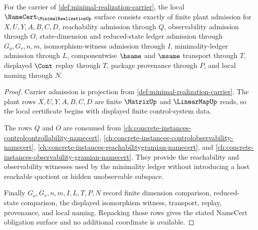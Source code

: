 \begin{theorem}
\label{thm:minimal-realization-namecert-obligations}
For the carrier of \autoref{def:minimal-realization-carrier}, the local $\NameCert_{\MinimalRealizationUp}$ surface consists exactly of finite plant admission for $X,U,Y,A,B,C,D$, reachability admission through $Q$, observability admission through $O$, state-dimension and reduced-state ledger admission through $G_o,G_r,n,m$, isomorphism-witness admission through $I$, minimality-ledger admission through $L$, componentwise $\hsame$ and $\msame$ transport through $T$, displayed $\Cont$ replay through $T$, package provenance through $P$, and local naming through $N$.
\end{theorem}
\begin{proof}
Carrier admission is projection from \autoref{def:minimal-realization-carrier}. The plant rows $X,U,Y,A,B,C,D$ are finite $\MatrixUp$ and $\LinearMapUp$ reads, so the local certificate begins with displayed finite control-system data.

The rows $Q$ and $O$ are consumed from \autoref{ch:concrete-instances-controlcontrollability-namecert}, \autoref{ch:concrete-instances-controlobservability-namecert}, \autoref{ch:concrete-instances-reachabilitygramian-namecert}, and \autoref{ch:concrete-instances-observability-gramian-namecert}. They provide the reachability and observability witnesses used by the minimality ledger without introducing a host reachable quotient or hidden unobservable subspace.

Finally $G_o,G_r,n,m,I,L,T,P,N$ record finite dimension comparison, reduced-state comparison, the displayed isomorphism witness, transport, replay, provenance, and local naming. Repacking those rows gives the stated NameCert obligation surface and no additional coordinate is available.
\end{proof}

